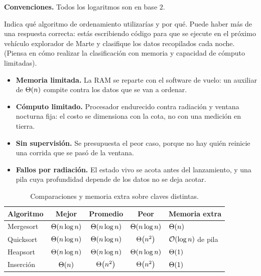 \documentclass[11pt,letterpaper]{article}
\begin{document}

\noindent\textbf{Convenciones.}
Todos los logaritmos son en base $2$.

\noindent Indica qué algoritmo de ordenamiento utilizarías y por qué.
Puede haber más de una respuesta correcta: estás escribiendo código
para que se ejecute en el próximo vehículo explorador de Marte y
clasifique los datos recopilados cada noche. (Piensa en cómo realizar
la clasificación con memoria y capacidad de cómputo limitadas).

\begin{itemize}[nosep,leftmargin=1.2em]
  \item \textbf{Memoria limitada.} La RAM se reparte con el software
    de vuelo: un auxiliar de $\Theta\!\left(n\right)$ compite contra los datos que
    se van a ordenar.
  \item \textbf{Cómputo limitado.} Procesador endurecido contra
    radiación y ventana nocturna fija: el costo se dimensiona con la
    cota, no con una medición en tierra.
  \item \textbf{Sin supervisión.} Se presupuesta el peor caso, porque
    no hay quién reinicie una corrida que se pasó de la ventana.
  \item \textbf{Fallos por radiación.} El estado vivo se acota antes
    del lanzamiento, y una pila cuya profundidad depende de los datos
    no se deja acotar.
\end{itemize}


\begin{table}[H]
  \centering\small
  \begin{tabular}{lcccl}
    \toprule
    \textbf{Algoritmo} & \textbf{Mejor} & \textbf{Promedio} &
      \textbf{Peor} & \textbf{Memoria extra} \\
    \midrule
    Mergesort & $\Theta\!\left(n\log n\right)$ & $\Theta\!\left(n\log n\right)$ & $\Theta\!\left(n\log n\right)$
      & $\Theta\!\left(n\right)$ \\
    Quicksort & $\Theta\!\left(n\log n\right)$ & $\Theta\!\left(n\log n\right)$ & $\Theta\!\left(n^2\right)$
      & $\mathcal{O}\!\left(\log n\right)$ de pila \\
    Heapsort & $\Theta\!\left(n\log n\right)$ & $\Theta\!\left(n\log n\right)$ & $\Theta\!\left(n\log n\right)$
      & $\Theta\!\left(1\right)$ \\
    Inserción & $\Theta\!\left(n\right)$ & $\Theta\!\left(n^2\right)$ & $\Theta\!\left(n^2\right)$ & $\Theta\!\left(1\right)$ \\
    \bottomrule
  \end{tabular}
  \caption{Comparaciones y memoria extra sobre claves distintas.}
  \label{ej15:ej15-tab-candidatos}
\end{table}
\end{document}
